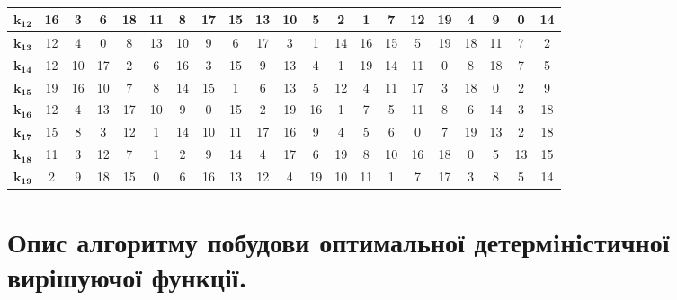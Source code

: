 \documentclass[a4paper,12pt]{article}
\begin{document}
\begin{table}[H]
\begin{adjustbox}{scale=0.82,center}
\begin{tabular}{|*{21}{c|}}
        $\mathbf{k_{12}}$ & 16 & 3 & 6 & 18 & 11 & 8 & 17 & 15 & 13 & 10 & 5 & 2 & 1 & 7 & 12 & 19 & 4 & 9 & 0 & 14 \\ \hline
        $\mathbf{k_{13}}$ & 12 & 4 & 0 & 8 & 13 & 10 & 9 & 6 & 17 & 3 & 1 & 14 & 16 & 15 & 5 & 19 & 18 & 11 & 7 & 2 \\ \hline
        $\mathbf{k_{14}}$ & 12 & 10 & 17 & 2 & 6 & 16 & 3 & 15 & 9 & 13 & 4 & 1 & 19 & 14 & 11 & 0 & 8 & 18 & 7 & 5 \\ \hline
        $\mathbf{k_{15}}$ & 19 & 16 & 10 & 7 & 8 & 14 & 15 & 1 & 6 & 13 & 5 & 12 & 4 & 11 & 17 & 3 & 18 & 0 & 2 & 9 \\ \hline
        $\mathbf{k_{16}}$ & 12 & 4 & 13 & 17 & 10 & 9 & 0 & 15 & 2 & 19 & 16 & 1 & 7 & 5 & 11 & 8 & 6 & 14 & 3 & 18 \\ \hline
        $\mathbf{k_{17}}$ & 15 & 8 & 3 & 12 & 1 & 14 & 10 & 11 & 17 & 16 & 9 & 4 & 5 & 6 & 0 & 7 & 19 & 13 & 2 & 18 \\ \hline
        $\mathbf{k_{18}}$ & 11 & 3 & 12 & 7 & 1 & 2 & 9 & 14 & 4 & 17 & 6 & 19 & 8 & 10 & 16 & 18 & 0 & 5 & 13 & 15 \\ \hline
        $\mathbf{k_{19}}$ & 2 & 9 & 18 & 15 & 0 & 6 & 16 & 13 & 12 & 4 & 19 & 10 & 11 & 1 & 7 & 17 & 3 & 8 & 5 & 14 \\ \hline
    \end{tabular}
\end{adjustbox}
    \caption{}
    \label{Tab2}
\end{table}

\vspace{1em}


\section{Опис алгоритму побудови оптимальної детермiнiстичної вирішуючої функції.}
\end{document}
